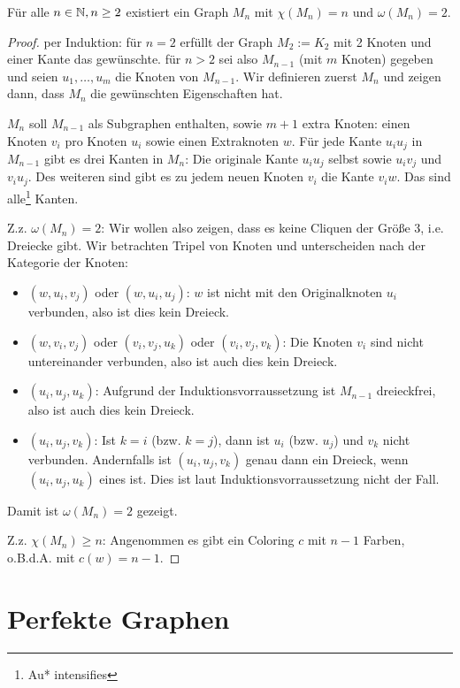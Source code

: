 \documentclass[../main.tex]{subfiles}
\begin{document}
\begin{satz}
    Für alle $n \in \mathbb{N}, n \geq 2$ existiert ein Graph $M_n$ mit $\chi(M_n) = n$ und $\omega(M_n) = 2$.
\end{satz}
\begin{proof}
    per Induktion: für $n = 2$ erfüllt der Graph $M_2 := K_2$ mit 2 Knoten und einer Kante das gewünschte.
    für $n > 2$ sei also $M_{n-1}$ (mit $m$ Knoten) gegeben und seien $u_1, \hdots, u_m$ die Knoten von $M_{n-1}$. Wir definieren zuerst $M_n$ und zeigen dann, dass $M_n$ die gewünschten Eigenschaften hat.

    $M_n$ soll $M_{n-1}$ als Subgraphen enthalten, sowie $m+1$ extra Knoten: einen Knoten $v_i$ pro Knoten $u_i$ sowie einen Extraknoten $w$. Für jede Kante $u_iu_j$ in $M_{n-1}$ gibt es drei Kanten in $M_n$: Die originale Kante $u_iu_j$ selbst sowie $u_iv_j$ und $v_iu_j$. Des weiteren sind gibt es zu jedem neuen Knoten $v_i$ die Kante $v_iw$. Das sind alle\footnote{Au* intensifies} Kanten.
    
    Z.z. $\omega(M_n) = 2$: Wir wollen also zeigen, dass es keine Cliquen der Größe 3, i.e. Dreiecke gibt. Wir betrachten Tripel von Knoten und unterscheiden nach der Kategorie der Knoten:
    \begin{itemize}
        \item $(w, u_i, v_j)$ oder $(w, u_i, u_j)$: $w$ ist nicht mit den Originalknoten $u_i$ verbunden, also ist dies kein Dreieck.
        \item $(w, v_i, v_j)$ oder $(v_i, v_j, u_k)$ oder $(v_i, v_j, v_k)$: Die Knoten $v_i$ sind nicht untereinander verbunden, also ist auch dies kein Dreieck.
        \item $(u_i, u_j, u_k)$: Aufgrund der Induktionsvorraussetzung ist $M_{n-1}$ dreieckfrei, also ist auch dies kein Dreieck.
        \item $(u_i, u_j, v_k)$: Ist $k=i$ (bzw. $k=j$), dann ist $u_i$ (bzw. $u_j$) und $v_k$ nicht verbunden. Andernfalls ist $(u_i, u_j, v_k)$ genau dann ein Dreieck, wenn $(u_i, u_j, u_k)$ eines ist. Dies ist laut Induktionsvorraussetzung nicht der Fall.
    \end{itemize}
    Damit ist $\omega(M_n) = 2$ gezeigt.

    Z.z. $\chi(M_n) \geq n$: Angenommen es gibt ein Coloring $c$ mit $n-1$ Farben, o.B.d.A. mit $c(w) = n-1$. 

\end{proof}

\section{Perfekte Graphen}
\end{document}
